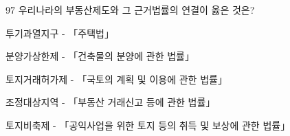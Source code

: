 \begin{question}{97}
우리나라의 부동산제도와 그 근거법률의 연결이 옳은 것은?
\begin{choices}
  \item 투기과열지구 - 「주택법」
  \item 분양가상한제 - 「건축물의 분양에 관한 법률」
  \item 토지거래허가제 - 「국토의 계획 및 이용에 관한 법률」
  \item 조정대상지역 - 「부동산 거래신고 등에 관한 법률」
  \item 토지비축제 - 「공익사업을 위한 토지 등의 취득 및 보상에 관한 법률」
\end{choices}
\end{question}
